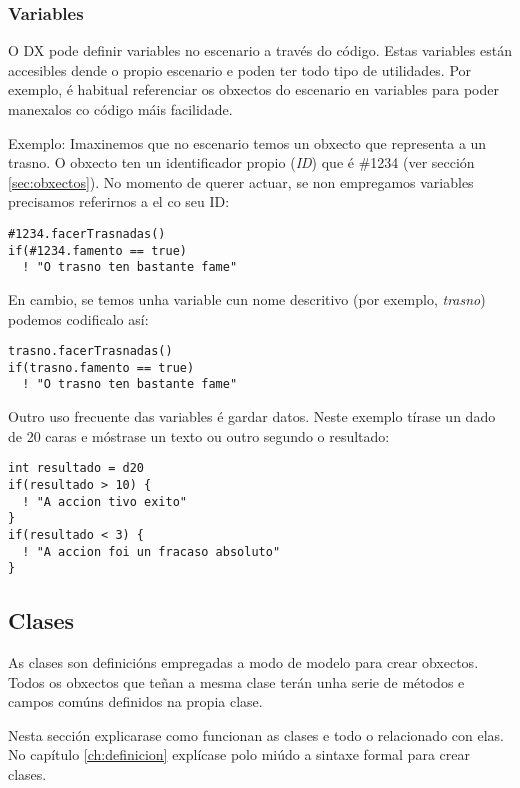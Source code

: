\subsubsection{Variables}
O DX pode definir variables no escenario a través do código. Estas variables
están accesibles dende o propio escenario e poden ter todo tipo de utilidades.
Por exemplo, é habitual referenciar os obxectos do escenario en variables para
poder manexalos co código máis facilidade.
\par
Exemplo: Imaxinemos que no escenario temos un obxecto que representa a un
trasno. O obxecto ten un identificador propio ({\it ID}) que é \#1234 (ver
sección \ref{sec:obxectos}).
No momento de querer actuar, se non empregamos variables precisamos referirnos a
el co seu ID:
\begin{lstlisting}
#1234.facerTrasnadas()
if(#1234.famento == true)
  ! "O trasno ten bastante fame"
\end{lstlisting}
\par
En cambio, se temos unha variable cun nome descritivo (por exemplo, {\it
trasno}) podemos codificalo así:
\begin{lstlisting}
trasno.facerTrasnadas()
if(trasno.famento == true)
  ! "O trasno ten bastante fame"
\end{lstlisting}
\par
Outro uso frecuente das variables é gardar datos. Neste exemplo tírase un dado
de 20 caras e móstrase un texto ou outro segundo o resultado:
\begin{lstlisting}
int resultado = d20
if(resultado > 10) {
  ! "A accion tivo exito"
}
if(resultado < 3) {
  ! "A accion foi un fracaso absoluto"
}
\end{lstlisting}



\subsection{Clases}
\label{sec:clases}
As clases son definicións empregadas a modo de modelo para crear obxectos. Todos
os obxectos que teñan a mesma clase terán unha serie de métodos e campos
comúns definidos na propia clase.
\par
Nesta sección explicarase como funcionan as clases e todo o relacionado con
elas. No capítulo \ref{ch:definicion} explícase polo miúdo a sintaxe formal para
crear clases.
